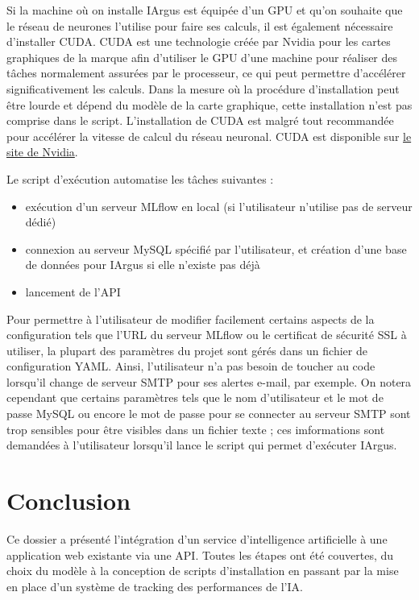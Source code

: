 \documentclass[french]{article}
\begin{document}
    Si la machine où on installe IArgus est équipée d'un GPU et qu'on souhaite que le réseau de neurones l'utilise pour faire ses calculs, il est également nécessaire d'installer CUDA. CUDA est une technologie créée par Nvidia pour les cartes graphiques de la marque afin d'utiliser le GPU d'une machine pour réaliser des tâches normalement assurées par le processeur, ce qui peut permettre d'accélérer significativement les calculs. Dans la mesure où la procédure d'installation peut être lourde et dépend du modèle de la carte graphique, cette installation n'est pas comprise dans le script. L'installation de CUDA est malgré tout recommandée pour accélérer la vitesse de calcul du réseau neuronal. CUDA est disponible sur \href{https://developer.nvidia.com/cuda-downloads}{le site de Nvidia}.

    Le script d'exécution automatise les tâches suivantes :
    \begin{itemize}
        \item exécution d'un serveur MLflow en local (si l'utilisateur n'utilise pas de serveur dédié)
        \item connexion au serveur MySQL spécifié par l'utilisateur, et création d'une base de données pour IArgus si elle n'existe pas déjà
        \item lancement de l'API
    \end{itemize}

    Pour permettre à l'utilisateur de modifier facilement certains aspects de la configuration tels que l'URL du serveur MLflow ou le certificat de sécurité SSL à utiliser, la plupart des paramètres du projet sont gérés dans un fichier de configuration YAML. Ainsi, l'utilisateur n'a pas besoin de toucher au code lorsqu'il change de serveur SMTP pour ses alertes e-mail, par exemple. On notera cependant que certains paramètres tels que le nom d'utilisateur et le mot de passe MySQL ou encore le mot de passe pour se connecter au serveur SMTP sont trop sensibles pour être visibles dans un fichier texte ; ces imformations sont demandées à l'utilisateur lorsqu'il lance le script qui permet d'exécuter IArgus.

    \newpage
    \section*{Conclusion}
    
    Ce dossier a présenté l'intégration d'un service d'intelligence artificielle à une application web existante via une API. Toutes les étapes ont été couvertes, du choix du modèle à la conception de scripts d'installation en passant par la mise en place d'un système de tracking des performances de l'IA.
\end{document}
